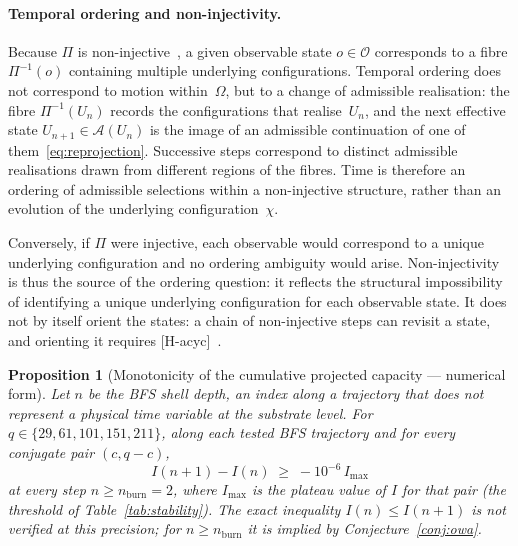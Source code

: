 \documentclass[11pt,a4paper]{article}
\newtheorem{proposition}{Proposition}
\begin{document}
  \paragraph{Temporal ordering and non-injectivity.}
    Because $\Pi$ is non-injective~\cite{Beau2026l}, a given observable
    state $o \in \mathcal{O}$ corresponds to a fibre $\Pi^{-1}(o)$
    containing multiple underlying configurations.
    Temporal ordering does not correspond to motion within~$\Omega$, but to
    a change of admissible realisation: the fibre $\Pi^{-1}(U_n)$ records the
    configurations that realise~$U_n$, and the next effective state
    $U_{n+1} \in \mathcal{A}(U_n)$ is the image of an admissible continuation of
    one of them~\eqref{eq:reprojection}.
    Successive steps correspond to distinct admissible realisations drawn
    from different regions of the fibres.
    Time is therefore an ordering of admissible selections within a
    non-injective structure, rather than an evolution of the underlying
    configuration~$\chi$.

    Conversely, if $\Pi$ were injective, each observable would correspond
    to a unique underlying configuration and no ordering ambiguity would
    arise.
    Non-injectivity is thus the source of the ordering question: it reflects
    the structural impossibility of identifying a unique underlying
    configuration for each observable state.
    It does not by itself orient the states: a chain of non-injective steps can
    revisit a state, and orienting it requires [H-acyc]~\cite{Beau2026m}.

    \begin{proposition}[Monotonicity of the cumulative projected capacity --- numerical form]
      \label{prop:order}
      Let $n$ be the BFS shell depth, an index along a trajectory that does not
      represent a physical time variable at the substrate level.
      For $q \in \{29, 61, 101, 151, 211\}$, along each tested BFS trajectory
      and for every conjugate pair $(c, q{-}c)$,
      \begin{equation}
        \label{eq:order}
        I(n+1) - I(n) \;\geq\; -10^{-6}\, I_{\max}
      \end{equation}
      at every step $n \geq n_{\mathrm{burn}} = 2$, where $I_{\max}$ is the plateau
      value of $I$ for that pair (the threshold of Table~\ref{tab:stability}).
      The exact inequality $I(n) \leq I(n+1)$ is not verified at this precision;
      for $n \geq n_{\mathrm{burn}}$ it is implied by Conjecture~\ref{conj:owa}.
    \end{proposition}
\end{document}
